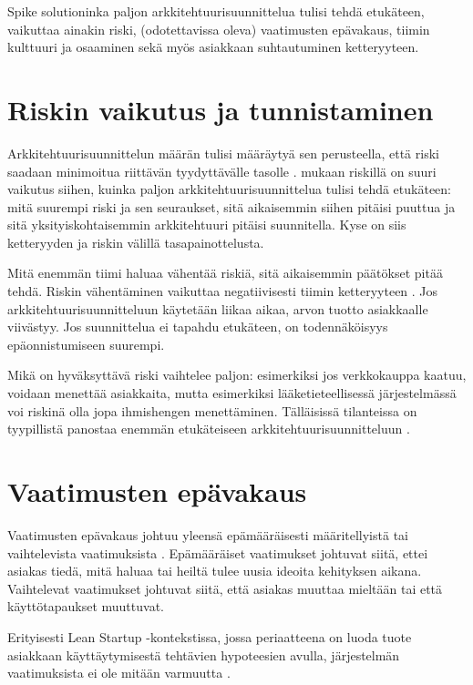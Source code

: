 Spike solutioninka paljon arkkitehtuurisuunnittelua tulisi tehdä etukäteen, vaikuttaa ainakin riski, (odotettavissa oleva) vaatimusten epävakaus, tiimin kulttuuri ja osaaminen sekä myös asiakkaan suhtautuminen ketteryyteen.

\section{Riskin vaikutus ja tunnistaminen}

Arkkitehtuurisuunnittelun määrän tulisi määräytyä sen perusteella, että riski saadaan minimoitua riittävän tyydyttävälle tasolle \citep{fairbanks2010just}. 
\cite{waterman_agility_2018_b} mukaan riskillä on suuri vaikutus siihen, kuinka paljon arkkitehtuurisuunnittelua tulisi tehdä etukäteen: mitä suurempi riski ja sen seuraukset, sitä aikaisemmin siihen pitäisi puuttua ja sitä yksityiskohtaisemmin arkkitehtuuri pitäisi suunnitella. Kyse on siis ketteryyden ja riskin välillä tasapainottelusta.

Mitä enemmän tiimi haluaa vähentää riskiä, sitä aikaisemmin päätökset pitää tehdä. Riskin vähentäminen vaikuttaa negatiivisesti tiimin ketteryyteen \citep{waterman_agility_2018_b}. Jos arkkitehtuurisuunnitteluun käytetään liikaa aikaa, arvon tuotto asiakkaalle viivästyy. Jos suunnittelua ei tapahdu etukäteen, on todennäköisyys epäonnistumiseen suurempi.

Mikä on hyväksyttävä riski vaihtelee paljon: esimerkiksi jos verkkokauppa kaatuu, voidaan menettää asiakkaita, mutta esimerkiksi lääketieteellisessä järjestelmässä voi riskinä olla jopa ihmishengen menettäminen. Tälläisissä tilanteissa on tyypillistä panostaa enemmän etukäteiseen arkkitehtuurisuunnitteluun \citep{waterman_agility_2018_b}. 

\section{Vaatimusten epävakaus}
Vaatimusten epävakaus johtuu yleensä epämääräisesti määritellyistä tai vaihtelevista vaatimuksista \citep{waterman_how_2015}. Epämääräiset vaatimukset johtuvat siitä, ettei asiakas tiedä, mitä haluaa tai heiltä tulee uusia ideoita kehityksen aikana. Vaihtelevat vaatimukset johtuvat siitä, että asiakas muuttaa mieltään tai että käyttötapaukset muuttuvat.

Erityisesti Lean Startup -kontekstissa, jossa periaatteena on luoda tuote asiakkaan käyttäytymisestä tehtävien hypoteesien avulla, järjestelmän vaatimuksista ei ole mitään varmuutta . \citep{reis2011lean}

